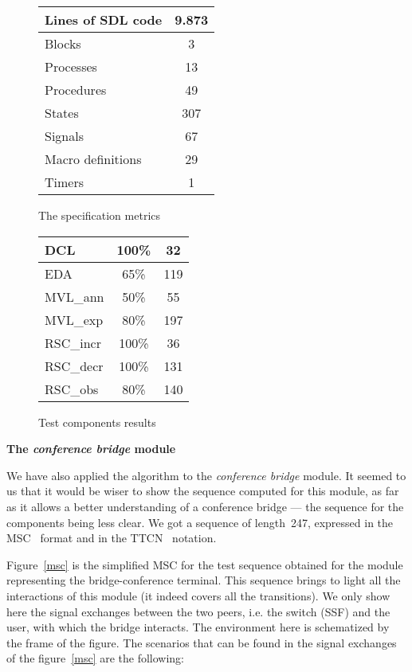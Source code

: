 \begin{figure}[htbp]
 \begin{minipage}[b]{.38\linewidth}
 \centering
  \begin{tabular}{|l|c|}
  \hline
  Lines of SDL code & 9.873\\
  \hline
  Blocks & 3\\
  \hline
  Processes  & 13\\
  \hline
  Procedures & 49\\
  \hline
  States & 307\\
  \hline
  Signals & 67\\
  \hline
  Macro definitions & 29\\
  \hline
  Timers & 1\\
  \hline
  \end{tabular}
  \caption{The specification metrics}
  \label{mesures}
  \end{minipage}\hfill
 \begin{minipage}[b]{.46\linewidth} 
 \begin{tabular}{|l|c|c|}
  \hline
  DCL & 100\% & 32\\
  \hline
  EDA & 65\% & 119\\
  \hline
  MVL\_ann & 50\% & 55\\
  \hline
  MVL\_exp & 80\% & 197\\
  \hline
  RSC\_incr & 100\% & 36\\
  \hline
  RSC\_decr & 100\% & 131\\
  \hline
  RSC\_obs & 80\% & 140\\
  \hline
  \end{tabular}
  \caption{Test components results}
  \label{resultats}
 \end{minipage}
\end{figure}

\vspace*{-4mm} \noindent \textbf{The \emph{conference bridge} module}

We have also applied the algorithm to the \emph{conference bridge} module.
It seemed to us that it would be wiser to show the sequence computed
for this module, as far as it allows a better understanding of a
conference bridge --- the sequence for the components being less
clear. We got a sequence of length~247, expressed in the
MSC~\cite{mscitu} format and in the TTCN~\cite{ISO1991} notation. 

Figure~\ref{msc} is the simplified MSC for the test sequence obtained
for the module representing the bridge-conference terminal. This
sequence brings to light all the interactions of this module (it
indeed covers all the transitions). We only show here the signal
exchanges between the two peers, i.e. the switch (SSF) and the user,
with which the bridge interacts. The environment here is schematized
by the frame of the figure. The scenarios that can be found in the
signal exchanges of the figure~\ref{msc} are the following:

